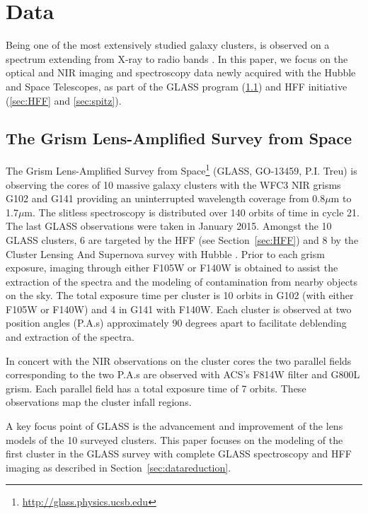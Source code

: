 \section{Data}
\label{sec:data}

Being one of the most extensively studied galaxy clusters, \cler is observed on a spectrum extending
from X-ray to radio bands \citep[e.g.][]{2004MNRAS.349..385K}. In this paper, we focus on the optical and NIR
imaging and spectroscopy data newly acquired with the Hubble and
\spitzer Space Telescopes, as part of the GLASS program (\ref{sec:glass}) and
HFF initiative (\ref{sec:HFF} and \ref{sec:spitz}).

\subsection{The Grism Lens-Amplified Survey from Space}
\label{sec:glass}

The Grism Lens-Amplified Survey from Space\footnote{\url{http://glass.physics.ucsb.edu}} (GLASS, GO-13459, P.I.
Treu) is observing the cores of 10 massive galaxy clusters with the \hst WFC3 NIR grisms G102 and G141 providing
an uninterrupted wavelength coverage from 0.8$\mu$m to 1.7$\mu$m.  The slitless spectroscopy is distributed over
140 orbits of \hst time in cycle 21. The last GLASS observations were taken in January 2015.  Amongst the 10
GLASS clusters, 6 are targeted by the HFF (see Section~\ref{sec:HFF}) and 8 by the Cluster Lensing And Supernova
survey with Hubble \citep[CLASH; P.I. Postman,][]{Postman:2012p27556}. Prior to each grism exposure, imaging
through either F105W or F140W is obtained to assist the extraction of the spectra and the modeling of
contamination from nearby objects on the sky.  The total exposure time per cluster is 10 orbits in G102 (with
either F105W or F140W) and 4 in G141 with F140W. Each cluster is observed at two position angles (P.A.s)
approximately 90 degrees apart to facilitate deblending and extraction of the spectra.

In concert with the NIR observations on the cluster cores
the two parallel fields corresponding to the two P.A.s are observed
with ACS's F814W filter and G800L grism.  Each parallel field has a
total exposure time of 7 orbits.  These observations map the cluster
infall regions.

A key focus point of GLASS is the advancement and improvement of the
lens models of the 10 surveyed clusters.  This paper focuses on the
modeling of the first cluster in the GLASS survey with complete GLASS
spectroscopy and HFF imaging as described in
Section~\ref{sec:datareduction}.


